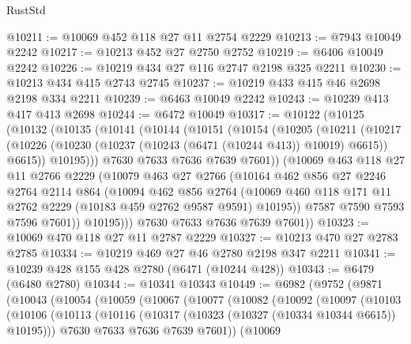 \begin{lexlean}{RustStd}
\begin{coremodule}
@10211 := @10069 @452 @118 @27 @11 @2754 @2229
@10213 := @7943 @10049 @2242
@10217 := @10213 @452 @27 @2750 @2752
@10219 := @6406 @10049 @2242
@10226 := @10219 @434 @27 @116 @2747 @2198 @325 @2211
@10230 := @10213 @434 @415 @2743 @2745
@10237 := @10219 @433 @415 @46 @2698 @2198 @334 @2211
@10239 := @6463 @10049 @2242
@10243 := @10239 @413 @417 @413 @2698
@10244 := @6472 @10049
@10317 := @10122
    (@10125
      (@10132
        (@10135
          (@10141
            (@10144
              (@10151
                (@10154
                  (@10205
                    (@10211
                      (@10217
                        (@10226
                          (@10230 (@10237 (@10243 (@6471 (@10244 @413)) @10019) @6615))
                          @6615))
                      @10195)))
                @7630
                @7633
                @7636
                @7639
                @7601))
            (@10069
              @463
              @118
              @27
              @11
              @2766
              @2229
              (@10079
                @463
                @27
                @2766
                (@10164
                  @462
                  @856
                  @27
                  @2246
                  @2764
                  @2114
                  @864
                  (@10094
                    @462
                    @856
                    @2764
                    (@10069 @460 @118 @171 @11 @2762 @2229 (@10183 @459 @2762 @9587 @9591) @10195))
                  @7587
                  @7590
                  @7593
                  @7596
                  @7601))
              @10195)))
        @7630
        @7633
        @7636
        @7639
        @7601))
@10323 := @10069 @470 @118 @27 @11 @2787 @2229
@10327 := @10213 @470 @27 @2783 @2785
@10334 := @10219 @469 @27 @46 @2780 @2198 @347 @2211
@10341 := @10239 @428 @155 @428 @2780 (@6471 (@10244 @428))
@10343 := @6479 (@6480 @2780)
@10344 := @10341 @10343
@10449 := @6982
    (@9752
      (@9871
        (@10043
          (@10054
            (@10059
              (@10067
                (@10077
                  (@10082
                    (@10092
                      (@10097
                        (@10103
                          (@10106
                            (@10113
                              (@10116 (@10317 (@10323 (@10327 (@10334 @10344 @6615)) @10195)))
                              @7630
                              @7633
                              @7636
                              @7639
                              @7601))
                          (@10069

\end{coremodule}
\end{lexlean}

